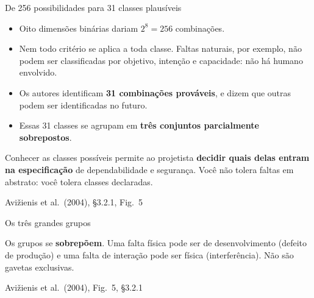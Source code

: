 \documentclass{beamer}
\newcommand{\sect}[1]{\par\smallskip\hfill{\tiny\color{black!55}Avi\v{z}ienis et al.\ (2004), #1}}
\begin{document}
\begin{frame}{De 256 possibilidades para 31 classes plaus\'iveis}
    \footnotesize
    \begin{itemize}
        \item Oito dimens\~oes bin\'arias dariam $2^8 = 256$ combina\c{c}\~oes.
        \item Nem todo crit\'erio se aplica a toda classe. Faltas naturais, por exemplo, n\~ao podem ser classificadas por objetivo, inten\c{c}\~ao e capacidade: n\~ao h\'a humano envolvido.
        \item Os autores identificam \textbf{31 combina\c{c}\~oes prov\'aveis}, e dizem que outras podem ser identificadas no futuro.
        \item Essas 31 classes se agrupam em \textbf{tr\^es conjuntos parcialmente sobrepostos}.
    \end{itemize}
    \medskip
    \begin{pratica}
        \scriptsize
        Conhecer as classes poss\'iveis permite ao projetista \textbf{decidir quais delas entram na especifica\c{c}\~ao} de dependabilidade e seguran\c{c}a. Voc\^e n\~ao tolera faltas em abstrato: voc\^e tolera classes declaradas.
    \end{pratica}
    \sect{\S3.2.1, Fig.\ 5}
\end{frame}

\begin{frame}{Os tr\^es grandes grupos}
    \centering
    \diagTresGrupos
    \vspace{0.2em}
    \begin{ancora}
        \scriptsize
        Os grupos se \textbf{sobrep\~oem}. Uma falta f\'isica pode ser de desenvolvimento (defeito de produ\c{c}\~ao) e uma falta de intera\c{c}\~ao pode ser f\'isica (interfer\^encia). N\~ao s\~ao gavetas exclusivas.
    \end{ancora}
    \sect{Fig.\ 5, \S3.2.1}
\end{frame}
\end{document}
